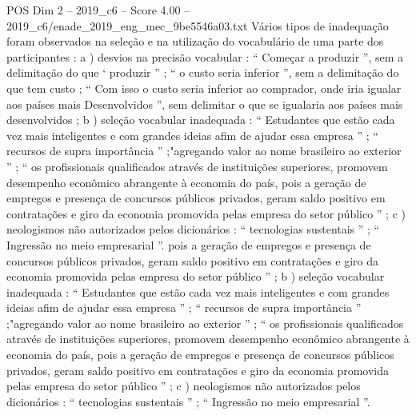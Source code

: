 \begin{textsample}{POS Dim 2 – 2019\_c6 – Score 4.00 – 2019\_c6/enade\_2019\_eng\_mec\_9be5546a03.txt}
Vários tipos de inadequação foram observados na seleção e na utilização do vocabulário de uma parte dos participantes : a ) desvios na precisão vocabular : “ Começar a produzir ”, sem a delimitação do que ‘ produzir ” ; “ o custo seria inferior ”, sem a delimitação do que tem custo ; “ Com isso o custo seria inferior ao comprador, onde iria igualar aos países mais Desenvolvidos ”, sem delimitar o que se igualaria aos países mais desenvolvidos ; b ) seleção vocabular inadequada : “ Estudantes que estão cada vez mais inteligentes e com grandes ideias afim de ajudar essa empresa ” ; “ recursos de supra importância ” ;"agregando valor ao nome brasileiro ao exterior ” ; “ os profissionais qualificados através de instituições superiores, promovem desempenho econômico abrangente à economia do país, pois a geração de empregos e presença de concursos públicos privados, geram saldo positivo em contratações e giro da economia promovida pelas empresa do setor público ” ; c ) neologismos não autorizados pelos dicionários : “ tecnologias sustentais ” ; “ Ingressão no meio empresarial ”. pois a geração de empregos e presença de concursos públicos privados, geram saldo positivo em contratações e giro da economia promovida pelas empresa do setor público ” ; b ) seleção vocabular inadequada : “ Estudantes que estão cada vez mais inteligentes e com grandes ideias afim de ajudar essa empresa ” ; “ recursos de supra importância ” ;"agregando valor ao nome brasileiro ao exterior ” ; “ os profissionais qualificados através de instituições superiores, promovem desempenho econômico abrangente à economia do país, pois a geração de empregos e presença de concursos públicos privados, geram saldo positivo em contratações e giro da economia promovida pelas empresa do setor público ” ; c ) neologismos não autorizados pelos dicionários : “ tecnologias sustentais ” ; “ Ingressão no meio empresarial ”.

\end{textsample}
